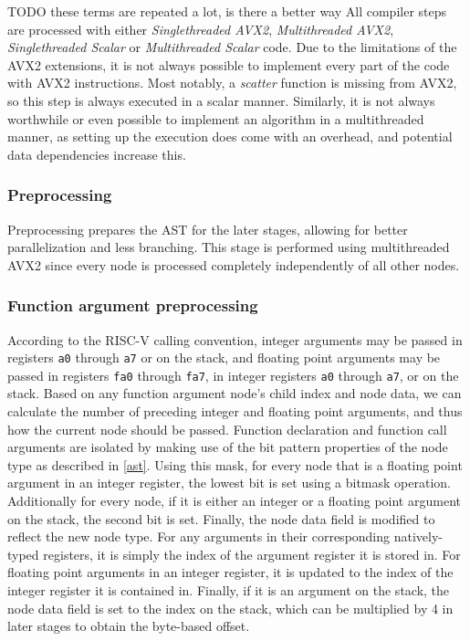 \documentclass[12pt,dvipsnames]{article}
\newcommand{\helpme}[1]{{\color{red}#1}}
\newcommand{\mono}[1]{\texttt{#1}}
\begin{document}
\helpme{TODO these terms are repeated a lot, is there a better way}
All compiler steps are processed with either \textit{Singlethreaded AVX2}, \textit{Multithreaded AVX2}, \textit{Singlethreaded Scalar} or \textit{Multithreaded Scalar} code. Due to the limitations of the AVX2 extensions, it is not always possible to implement every part of the code with AVX2 instructions. Most notably, a \textit{scatter} function is missing from AVX2, so this step is always executed in a scalar manner. Similarly, it is not always worthwhile or even possible to implement an algorithm in a multithreaded manner, as setting up the execution does come with an overhead, and potential data dependencies increase this.

\subsubsection{Preprocessing} \label{preprocessing}
Preprocessing prepares the AST for the later stages, allowing for better parallelization and less branching. This stage is performed using multithreaded AVX2 since every node is processed completely independently of all other nodes.

\subsubsection*{Function argument preprocessing}
According to the RISC-V calling convention, integer arguments may be passed in registers \mono{a0} through \mono{a7} or on the stack, and floating point arguments may be passed in registers \mono{fa0} through \mono{fa7}, in integer registers \mono{a0} through \mono{a7}, or on the stack. Based on any function argument node's child index and node data, we can calculate the number of preceding integer and floating point arguments, and thus how the current node should be passed. Function declaration and function call arguments are isolated by making use of the bit pattern properties of the node type as described in \autoref{ast}. Using this mask, for every node that is a floating point argument in an integer register, the lowest bit is set using a bitmask operation. Additionally for every node, if it is either an integer or a floating point argument on the stack, the second bit is set. Finally, the node data field is modified to reflect the new node type. For any arguments in their corresponding natively-typed registers, it is simply the index of the argument register it is stored in. For floating point arguments in an integer register, it is updated to the index of the integer register it is contained in. Finally, if it is an argument on the stack, the node data field is set to the index on the stack, which can be multiplied by 4 in later stages to obtain the byte-based offset. 
\end{document}
